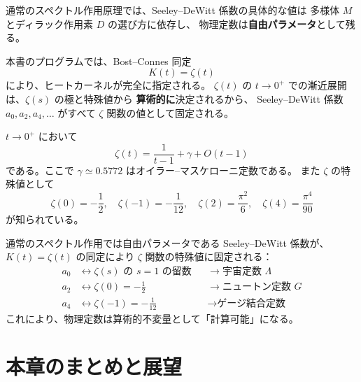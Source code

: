通常のスペクトル作用原理では、Seeley--DeWitt 係数の具体的な値は
多様体 $M$ とディラック作用素 $D$ の選び方に依存し、
物理定数は\textbf{自由パラメータ}として残る。

本書のプログラムでは、Bost--Connes 同定
\begin{equation}
  K(t) = \zeta(t)
  \label{eq:BC-identification}
\end{equation}
により、ヒートカーネルが完全に指定される。
$\zeta(t)$ の $t \to 0^+$ での漸近展開は、$\zeta(s)$ の極と特殊値から
\textbf{算術的に}決定されるから、
Seeley--DeWitt 係数 $a_0, a_2, a_4, \ldots$ がすべて
$\zeta$ 関数の値として固定される。

\begin{theorem}
\label{thm:zeta-asymptotics}
$t \to 0^+$ において
\begin{equation}
  \zeta(t) = \frac{1}{t - 1} + \gamma + O(t-1)
  \label{eq:zeta-laurent}
\end{equation}
である。ここで $\gamma \simeq 0.5772$ はオイラー--マスケローニ定数である。
また $\zeta$ の特殊値として
\begin{equation}
  \zeta(0) = -\frac{1}{2}, \quad
  \zeta(-1) = -\frac{1}{12}, \quad
  \zeta(2) = \frac{\pi^2}{6}, \quad
  \zeta(4) = \frac{\pi^4}{90}
\end{equation}
が知られている。
\end{theorem}

\begin{keyresult}[算術的固定のメカニズム]
通常のスペクトル作用では自由パラメータである Seeley--DeWitt 係数が、
$K(t) = \zeta(t)$ の同定により $\zeta$ 関数の特殊値に固定される：
\begin{align}
  a_0 &\longleftrightarrow \zeta(s) \text{ の } s=1 \text{ の留数}
    & &\to \text{宇宙定数 $\Lambda$} \label{eq:a0-fix} \\
  a_2 &\longleftrightarrow \zeta(0) = -\frac{1}{2}
    & &\to \text{ニュートン定数 $G$} \label{eq:a2-fix} \\
  a_4 &\longleftrightarrow \zeta(-1) = -\frac{1}{12}
    & &\to \text{ゲージ結合定数} \label{eq:a4-fix}
\end{align}
これにより、物理定数は算術的不変量として「計算可能」になる。
\end{keyresult}


\section{本章のまとめと展望}
\label{sec:ch3-summary}

